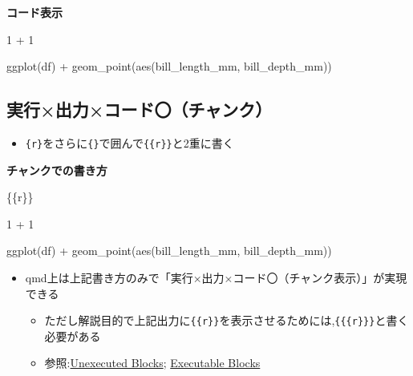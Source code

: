 \documentclass[
  b5paper,
  xelatex, ja=standard]{bxjsbook}
\newenvironment{Shaded}{\begin{snugshade}}{\end{snugshade}}
\newcommand{\DecValTok}[1]{\textcolor[rgb]{0.68,0.00,0.00}{#1}}
\newcommand{\FunctionTok}[1]{\textcolor[rgb]{0.28,0.35,0.67}{#1}}
\newcommand{\InformationTok}[1]{\textcolor[rgb]{0.37,0.37,0.37}{#1}}
\newcommand{\NormalTok}[1]{\textcolor[rgb]{0.00,0.23,0.31}{#1}}
\newcommand{\SpecialCharTok}[1]{\textcolor[rgb]{0.37,0.37,0.37}{#1}}
\providecommand{\tightlist}{%
  \setlength{\itemsep}{0pt}\setlength{\parskip}{0pt}}\usepackage{longtable,booktabs,array}
\begin{document}
\textbf{コード表示}

\begin{Shaded}
\begin{Highlighting}[]
\DecValTok{1} \SpecialCharTok{+} \DecValTok{1}


\FunctionTok{ggplot}\NormalTok{(df) }\SpecialCharTok{+}
  \FunctionTok{geom\_point}\NormalTok{(}\FunctionTok{aes}\NormalTok{(bill\_length\_mm, bill\_depth\_mm))}
\end{Highlighting}
\end{Shaded}

\subsection{実行×\textbar 出力×\textbar コード〇（チャンク）}

\begin{itemize}
\tightlist
\item
  \texttt{\{r\}}をさらに\texttt{\{\}}で囲んで\texttt{\{\{r\}\}}と2重に書く
\end{itemize}

\textbf{チャンクでの書き方}

\begin{Shaded}
\begin{Highlighting}[]
\InformationTok{\textasciigrave{}\textasciigrave{}\textasciigrave{}\{\{r\}\}}


\InformationTok{1 + 1}


\InformationTok{ggplot(df) +}
\InformationTok{  geom\_point(aes(bill\_length\_mm, bill\_depth\_mm))}
\InformationTok{\textasciigrave{}\textasciigrave{}\textasciigrave{}}
\end{Highlighting}
\end{Shaded}

\begin{itemize}
\tightlist
\item
  qmd上は上記書き方のみで「実行×\textbar 出力×\textbar コード〇（チャンク表示）」が実現できる

  \begin{itemize}
  \tightlist
  \item
    ただし解説目的で上記出力に\texttt{\{\{r\}\}}を表示させるためには,\texttt{\{\{\{r\}\}\}}と書く必要がある
  \item
    参照:\href{https://quarto.org/docs/computations/execution-options.html\#unexecuted-blocks}{Unexecuted
    Blocks};
    \href{https://quarto.org/docs/output-formats/html-code.html\#executable-blocks}{Executable
    Blocks}
  \end{itemize}
\end{itemize}
\end{document}
